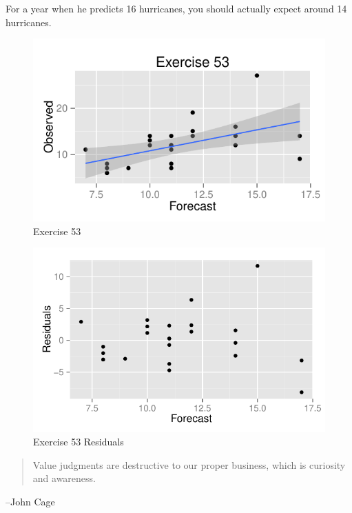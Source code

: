 \documentclass[letterpaper, landscape]{exam}
\begin{document}
\begin{description}
        For a year when he predicts 16 hurricanes, you should actually expect
        around 14 hurricanes.

        \begin{figure}[H]
          \centering
          \includegraphics{figures/ex53.pdf}
          \caption{Exercise 53}
        \end{figure}

        \begin{figure}[H]
          \centering
          \includegraphics{figures/ex53_residuals.pdf}
          \caption{Exercise 53 Residuals}
        \end{figure}

    \end{description}

  \else
    \vspace{1.5 cm}
    \begin{quote}
      \begin{em}
        Value judgments are destructive to our proper business, which is
        curiosity and awareness. 
      \end{em}
    \end{quote}
    \hspace{1 cm} --John Cage
  \fi
\end{document}
